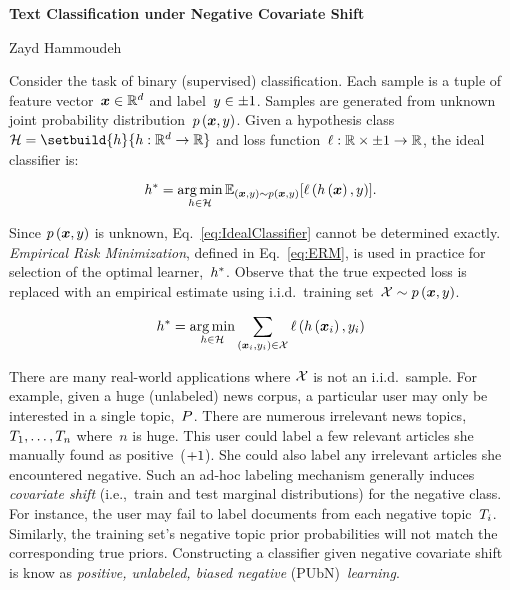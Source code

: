 \documentclass[10pt]{article}
\begin{document}
  \begin{center}
    {\Large \textbf{Text Classification under Negative Covariate Shift}}

    \vspace{6pt}{\large Project Proposal}

    \vspace{6pt}Zayd Hammoudeh
  \end{center}

  Consider the task of binary (supervised) classification.  Each sample is a tuple of feature vector~${\boldsymbol{x} \in \mathbb{R}^{d}}$ and label~${y \in {\pm}1}$.  Samples are generated from unknown joint probability distribution~$p\left(\boldsymbol{x},y\right)$.  Given a hypothesis class~${\hypoCls=\setbuild{\dec}{\func{\dec}{\domain}{\real}}}$ and loss function~${\ell:\mathbb{R} \times {\pm}1\rightarrow\mathbb{R}}$, the ideal classifier is:

  \begin{equation}\label{eq:IdealClassifier}
    h^{*} = \operatorname*{arg\,min}_{h \in \mathcal{H}} \mathbb{E}_{(\boldsymbol{x}, y) \sim p\left(\boldsymbol{x},y\right)} \lbrack\ell\left(h\left(\boldsymbol{x}\right), y\right)\rbrack\text{.}
  \end{equation}

  Since $p\left(\boldsymbol{x},y\right)$ is unknown, Eq.~\eqref{eq:IdealClassifier} cannot be determined exactly.  \textit{Empirical Risk Minimization}, defined in Eq.~\eqref{eq:ERM}, is used in practice for selection of the optimal learner,~${h^{*}}$. Observe that the true expected loss is replaced with an empirical estimate using i.i.d.\ training set~${\mathcal{X} \sim p\left(\boldsymbol{x},y\right)}$.

  \begin{equation}\label{eq:ERM}
    h^{*} = \operatorname*{arg\,min}_{h \in \mathcal{H}} \sum_{(\boldsymbol{x}_i,y_i) \in \mathcal{X}} \ell\left(h\left(\boldsymbol{x}_i\right), y_i\right)
  \end{equation}

  There are many real-world applications where $\mathcal{X}$ is not an i.i.d.\ sample. For example, given a huge (unlabeled) news corpus, a particular user may only be interested in a single topic,~$P$.  There are numerous irrelevant news topics,~${T_1,\ldots,T_n}$ where~$n$ is huge.  This user could label a few relevant articles she manually found as positive~(${+}1$). She could also label any irrelevant articles she encountered negative. Such an ad-hoc labeling mechanism generally induces \textit{covariate shift} (i.e.,~train and test marginal distributions) for the negative class. For instance, the user may fail to label documents from each negative topic~$T_i$. Similarly, the training set's negative topic prior probabilities will not match the corresponding true priors. Constructing a classifier given negative covariate shift is know as \textit{positive, unlabeled, biased negative} (PUbN)~\textit{learning}.
\end{document}
